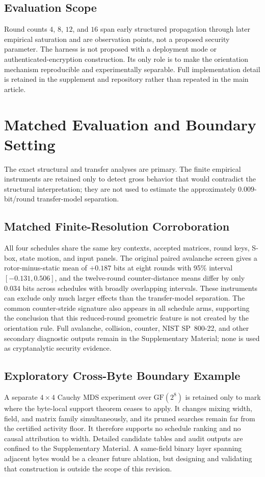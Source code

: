\documentclass[cryptography,article,submit,oneauthor]{Definitions/mdpi}
\begin{document}
\subsection{Evaluation Scope}\label{sec:4-3}
Round counts $4$, $8$, $12$, and $16$ span early structured propagation through later empirical saturation and are observation points, not a proposed security parameter. The harness is not proposed with a deployment mode or authenticated-encryption construction. Its only role is to make the orientation mechanism reproducible and experimentally separable. Full implementation detail is retained in the supplement and repository rather than repeated in the main article.
\section{Matched Evaluation and Boundary Setting}\label{sec:primary}
The exact structural and transfer analyses are primary. The finite empirical instruments are retained only to detect gross behavior that would contradict the structural interpretation; they are not used to estimate the approximately $0.009$-bit/round transfer-model separation.

\subsection{Matched Finite-Resolution Corroboration}\label{sec:5-9}
All four schedules share the same key contexts, accepted matrices, round keys, S-box, state motion, and input panels. The original paired avalanche screen gives a rotor-minus-static mean of $+0.187$ bits at eight rounds with 95\% interval $[-0.131,0.506]$, and the twelve-round counter-distance means differ by only $0.034$ bits across schedules with broadly overlapping intervals. These instruments can exclude only much larger effects than the transfer-model separation. The common counter-stride signature also appears in all schedule arms, supporting the conclusion that this reduced-round geometric feature is not created by the orientation rule. Full avalanche, collision, counter, NIST SP~800-22, and other secondary diagnostic outputs remain in the Supplementary Material; none is used as cryptanalytic security evidence.

\subsection{Exploratory Cross-Byte Boundary Example}\label{sec:5-10}
A separate $4\times4$ Cauchy MDS experiment over $\mathrm{GF}(2^8)$ is retained only to mark where the byte-local support theorem ceases to apply. It changes mixing width, field, and matrix family simultaneously, and its pruned searches remain far from the certified activity floor. It therefore supports no schedule ranking and no causal attribution to width. Detailed candidate tables and audit outputs are confined to the Supplementary Material. A same-field binary layer spanning adjacent bytes would be a cleaner future ablation, but designing and validating that construction is outside the scope of this revision.
\end{document}
